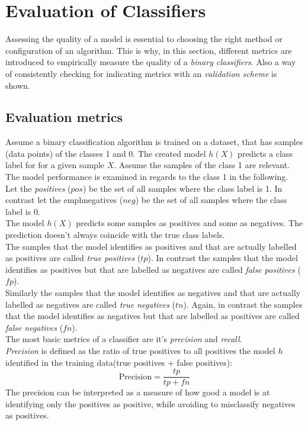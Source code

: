 \section{Evaluation of Classifiers}
Assessing the quality of a model is essential to choosing the right method or configuration of an algorithm. This is why, in this section, different metrics are introduced to empirically  measure the quality of a \emph{binary classifiers}. Also a way of consistently checking for indicating metrics with an \emph{validation scheme} is shown.
\\

\subsection*{Evaluation metrics}
Assume a binary classification algorithm is trained on a dataset, that has samples (data points) of the classes 1 and 0. The created model $h(X)$ predicts a class label for for a given sample $X$. Assume the samples of the class 1 are relevant. The model performance is examined in regards to the class 1 in the following. 
\\
Let the  \emph{positives} ($pos$) be the set of all samples where the class label is 1. In contrast let the emph{negatives} ($neg$) be the set of all samples where the class label is 0.
\\
The model $h(X)$ predicts some samples as positives and some as negatives. The prediction doesn't always coincide with the true class labels.
\\
The samples that the model identifies as positives and that are actually labelled as positives are called \emph{true positives} ($tp$).
In contrast the samples that the model identifies as positives but that are labelled as negatives are called \emph{false positives} ($fp$). 
\\
Similarly the samples that the model identifies as negatives and that are actually labelled as negatives are called \emph{true negatives} ($tn$).
Again, in contrast the samples that the model identifies as negatives but that are labelled as positives are called \emph{false negatives} ($fn$).
\\

The most basic metrics of a classifier are it's \emph{precision} and \emph{recall}.
\\

\emph{Precision} is defined as the ratio of true positives to all positives the model $h$ identified in the training data(true positives + false positives):
\begin{equation} \label{eq:ev1}
\text{Precision}=\frac{tp}{tp+fn}
\end{equation}
The precision can be interpreted as a measure of how good a model is at identifying only the positives as positive, while avoiding to misclassify negatives as positives. 
\\

